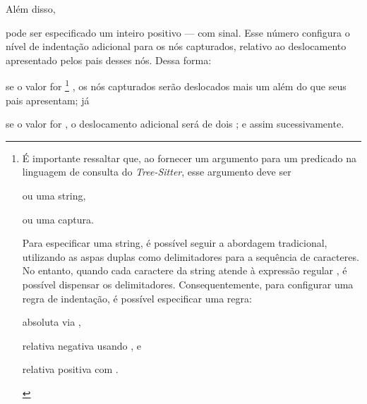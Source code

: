 \documentclass
  [11pt,a4paper,english,brazil,openright,sumario=tradicional,twoside]
  {abntex2}
\newcommand{\treesitter}{\textit{Tree-Sitter}\xspace}
\begin{document}
\begin{inparaenum}
          Além disso,
    \item pode ser especificado um inteiro positivo --- com sinal. Esse número
          configura o nível de indentação adicional para os nós capturados,
          relativo ao deslocamento apresentado pelos pais desses nós. Dessa
          forma:
          \begin{inparaenum}
            \item se o valor for %
                  \footnote
                    { É importante ressaltar que, ao fornecer um argumento para
                      um predicado na linguagem de consulta do \treesitter,
                      esse argumento deve ser
                      \begin{inparaenum}[(I)]
                        \item ou uma string,
                        \item ou uma captura.
                      \end{inparaenum}
                      Para especificar uma string, é possível seguir a
                      abordagem tradicional, utilizando as aspas duplas como
                      delimitadores para a sequência de caracteres. No entanto,
                      quando cada caractere da string atende à expressão
                      regular \usebox{\querystringregex}, é possível dispensar
                      os delimitadores. Consequentemente, para configurar uma
                      regra de indentação, é possível especificar uma regra:
                      \begin{inparaenum}[(I)]
                        \item absoluta via \usebox{\indentruleabs},
                        \item relativa negativa usando \usebox{\indentruleneg},
                              e
                        \item relativa positiva com \usebox{\indentrulepos}.
                      \end{inparaenum}}%
                  , os nós capturados
                  serão deslocados mais um 
                  além do que seus pais apresentam; já
            \item se o valor for , o deslocamento
                  adicional será de dois ; e
                  assim sucessivamente.
          \end{inparaenum}


\end{inparaenum}
\end{document}
